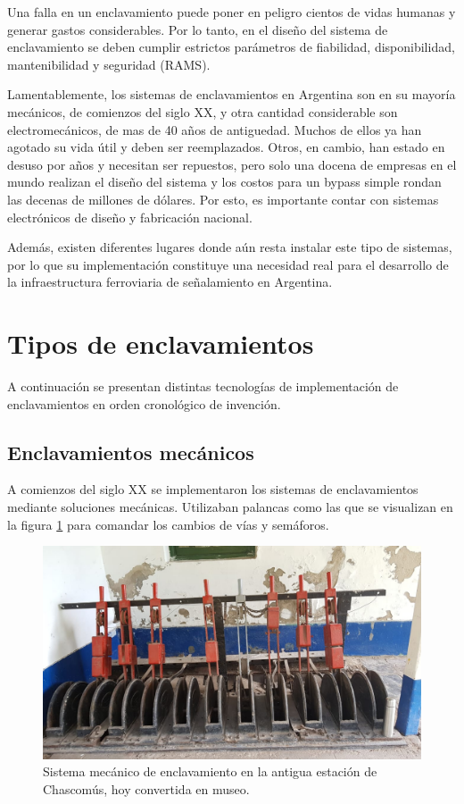 	 	Una falla en un enclavamiento puede poner en peligro cientos de vidas humanas y generar gastos considerables. Por lo tanto, en el diseño del sistema de enclavamiento se deben cumplir estrictos parámetros de fiabilidad, disponibilidad, mantenibilidad y seguridad (RAMS).
	 	
	 	Lamentablemente, los sistemas de enclavamientos en Argentina son en su mayoría mecánicos, de comienzos del siglo XX, y otra cantidad considerable son electromecánicos, de mas de 40 años de antiguedad. Muchos de ellos ya han agotado su vida útil y deben ser reemplazados. Otros, en cambio, han estado en desuso por años y necesitan ser repuestos, pero solo una docena de empresas en el mundo realizan el diseño del sistema y los costos para un bypass simple rondan las decenas de millones de dólares. Por esto, es importante contar con sistemas electrónicos de diseño y fabricación nacional.

		Además, existen diferentes lugares donde aún resta instalar este tipo de sistemas, por lo que su implementación constituye una necesidad real para el desarrollo de la infraestructura ferroviaria de señalamiento en Argentina.		
	
	\section{Tipos de enclavamientos}
		
		A continuación se presentan distintas tecnologías de implementación de enclavamientos en orden cronológico de invención.
		
		\subsection{Enclavamientos mecánicos}
			
			A comienzos del siglo XX se implementaron los sistemas de enclavamientos mediante soluciones mecánicas. Utilizaban palancas como las que se visualizan en la figura \ref{fig:Mecanico} para comandar los cambios de vías y semáforos.
	
			\begin{figure}[htbp!]
				\centering
				\includegraphics[scale=.27]{./Figures/Mecanico}
				\caption{Sistema mecánico de enclavamiento en la antigua estación de Chascomús, hoy convertida en museo.}
				\label{fig:Mecanico}
			\end{figure}

